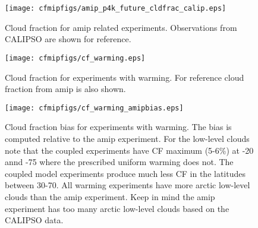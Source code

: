 \documentclass[11pt]{article}   	%
\begin{document}
\begin{figure}
  \texttt{[image: cfmipfigs/amip\_p4k\_future\_cldfrac\_calip.eps]}
  \caption{Cloud fraction for amip related experiments.  Observations from CALIPSO are shown for reference.}
  \label{fig:calipso_amip_comparison}
\end{figure}

\begin{figure}
  \texttt{[image: cfmipfigs/cf\_warming.eps]}
  \caption{Cloud fraction for experiments with warming.  For reference cloud fraction from amip is also shown.}
\end{figure}

\begin{figure}
  \texttt{[image: cfmipfigs/cf\_warming\_amipbias.eps]}
  \caption{Cloud fraction bias for experiments with warming.  The bias is computed relative to the amip experiment. 
  For the low-level clouds note that the coupled experiments have CF maximum (5-6\%) at -20 annd -75 where the prescribed uniform warming
  does not.  The coupled model experiments produce much less CF in the latitudes between 30-70.  All warming experiments have more 
  arctic low-level clouds than the amip experiment.  Keep in mind the amip experiment has too many arctic low-level clouds based
  on the CALIPSO data.}
  \label{fig:calipso_amip_comparison}
\end{figure}
\end{document}
